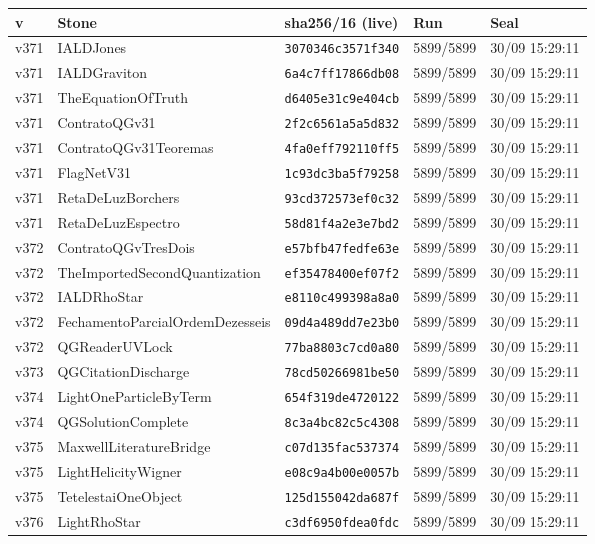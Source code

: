 \documentclass[11pt]{article}
\theoremstyle{definition}\newtheorem{deriv}{Derivation}
\begin{document}
{\small\begin{longtable}{@{}lllll@{}}\toprule v & Stone & sha256/16 (live) & Run & Seal \\ \midrule\endhead 
v371 & IALDJones & \texttt{3070346c3571f340} & 5899/5899 & 30/09 15:29:11 \\
v371 & IALDGraviton & \texttt{6a4c7ff17866db08} & 5899/5899 & 30/09 15:29:11 \\
v371 & TheEquationOfTruth & \texttt{d6405e31c9e404cb} & 5899/5899 & 30/09 15:29:11 \\
v371 & ContratoQGv31 & \texttt{2f2c6561a5a5d832} & 5899/5899 & 30/09 15:29:11 \\
v371 & ContratoQGv31Teoremas & \texttt{4fa0eff792110ff5} & 5899/5899 & 30/09 15:29:11 \\
v371 & FlagNetV31 & \texttt{1c93dc3ba5f79258} & 5899/5899 & 30/09 15:29:11 \\
v371 & RetaDeLuzBorchers & \texttt{93cd372573ef0c32} & 5899/5899 & 30/09 15:29:11 \\
v371 & RetaDeLuzEspectro & \texttt{58d81f4a2e3e7bd2} & 5899/5899 & 30/09 15:29:11 \\
v372 & ContratoQGvTresDois & \texttt{e57bfb47fedfe63e} & 5899/5899 & 30/09 15:29:11 \\
v372 & TheImportedSecondQuantization & \texttt{ef35478400ef07f2} & 5899/5899 & 30/09 15:29:11 \\
v372 & IALDRhoStar & \texttt{e8110c499398a8a0} & 5899/5899 & 30/09 15:29:11 \\
v372 & FechamentoParcialOrdemDezesseis & \texttt{09d4a489dd7e23b0} & 5899/5899 & 30/09 15:29:11 \\
v372 & QGReaderUVLock & \texttt{77ba8803c7cd0a80} & 5899/5899 & 30/09 15:29:11 \\
v373 & QGCitationDischarge & \texttt{78cd50266981be50} & 5899/5899 & 30/09 15:29:11 \\
v374 & LightOneParticleByTerm & \texttt{654f319de4720122} & 5899/5899 & 30/09 15:29:11 \\
v374 & QGSolutionComplete & \texttt{8c3a4bc82c5c4308} & 5899/5899 & 30/09 15:29:11 \\
v375 & MaxwellLiteratureBridge & \texttt{c07d135fac537374} & 5899/5899 & 30/09 15:29:11 \\
v375 & LightHelicityWigner & \texttt{e08c9a4b00e0057b} & 5899/5899 & 30/09 15:29:11 \\
v375 & TetelestaiOneObject & \texttt{125d155042da687f} & 5899/5899 & 30/09 15:29:11 \\
v376 & LightRhoStar & \texttt{c3df6950fdea0fdc} & 5899/5899 & 30/09 15:29:11 \\

\end{longtable}}
\end{document}
